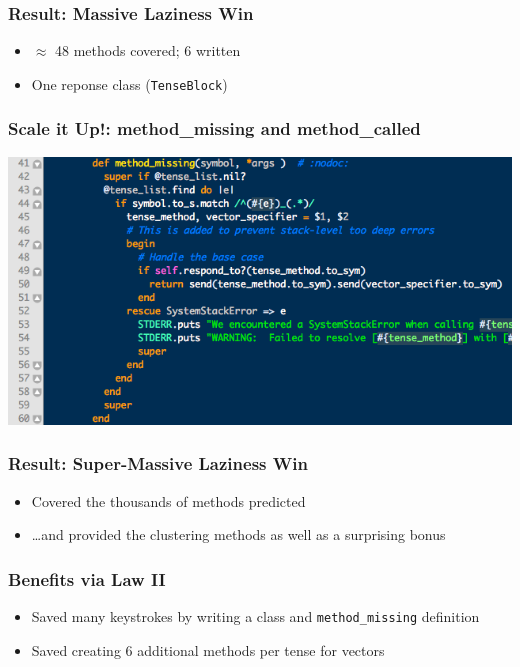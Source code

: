 \documentclass[slidestop,compress,mathserif]{beamer}
\begin{document}
\begin{frame}
	\frametitle{Result:  Massive Laziness Win}
	\begin{itemize}
		\item $\approx$ 48 methods covered; 6 written
		\item One reponse class (\texttt{TenseBlock})
	\end{itemize}
\end{frame}

\begin{frame}
	\frametitle{Scale it Up!: method\_missing and method\_called}
	\includegraphics[scale=0.45]{img/lv_mm.png}	
\end{frame}

\begin{frame}
	\frametitle{Result:  Super-Massive Laziness Win}
	\begin{itemize}
		\item Covered the thousands of methods predicted
		\item \ldots and provided the clustering methods as well as a surprising bonus
	\end{itemize}
\end{frame}

\begin{frame}
	\frametitle{Benefits via Law II}
	\begin{itemize}
		\item Saved many keystrokes by writing a class and \texttt{method\_missing} definition
		\pause
		\item Saved creating 6 additional methods per tense for vectors
	\end{itemize}
\end{frame}
\end{document}
